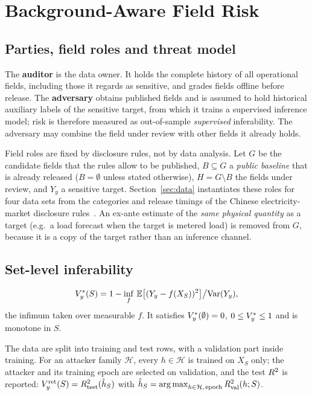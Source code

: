 \section{Background-Aware Field Risk}\label{sec:problem}\label{sec:mk}

\subsection{Parties, field roles and threat model}
The \textbf{auditor} is the data owner. It holds the complete history of all operational
fields, including those it regards as sensitive, and grades fields offline before release.
The \textbf{adversary} obtains published fields and is assumed to hold historical auxiliary
labels of the sensitive target, from which it trains a supervised inference model; risk is
therefore measured as out-of-sample \emph{supervised} inferability. The adversary may combine
the field under review with other fields it already holds.

Field roles are fixed by disclosure rules, not by data analysis. Let $G$ be the candidate
fields that the rules allow to be published, $B\subseteq G$ a \emph{public baseline} that is
already released ($B=\emptyset$ unless stated otherwise), $H=G\setminus B$ the fields under
review, and $Y_y$ a sensitive target. Section~\ref{sec:data} instantiates these roles for
four data sets from the categories and release timings of the Chinese electricity-market
disclosure rules~\cite{nea2024disclosure}. An ex-ante estimate of the \emph{same physical
quantity} as a target (e.g.\ a load forecast when the target is metered load) is removed from
$G$, because it is a copy of the target rather than an inference channel.

\subsection{Set-level inferability}
\begin{definition}
\[
V_y^{*}(S) = 1 - \inf_{f}\,\mathbb{E}\big[(Y_y - f(X_S))^{2}\big] \big/ \mathrm{Var}(Y_y),
\]
the infimum taken over measurable $f$. It satisfies $V_y^{*}(\emptyset)=0$, $0 \le V_y^{*} \le 1$
and is monotone in $S$.
\end{definition}

\begin{definition}\label{def:vret}
The data are split into training and test rows, with a validation part inside training. For
an attacker family $\mathcal{H}$, every $h\in\mathcal{H}$ is trained on $X_S$ only; the
attacker and its training epoch are selected on validation, and the test $R^2$ is reported:
$V_y^{\mathrm{ret}}(S) = R^2_{\mathrm{test}}(\hat h_S)$ with
$\hat h_S = \operatorname*{arg\,max}_{h \in \mathcal{H},\,\mathrm{epoch}} R^2_{\mathrm{val}}(h;S)$.
\end{definition}

